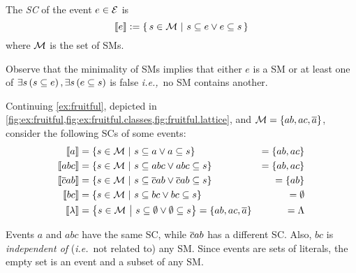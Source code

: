 \documentclass[x11names]{tlp}
\begin{document}
The \textit{\acf{SC}} of the event $e\in \EVENTSset$ is
\begin{equation}
	\stablecore{e} := \set{\, s \in \MODELset \given s \subseteq e \vee e \subseteq s\, } \label{eq:stable.core}
\end{equation}
where $\MODELset$ is the set of \aclp{SM}.

Observe that the minimality of \aclp{SM} implies that either $e$ is a \acl{SM} or at least one of $\exists s \del{s \subseteq e}, \exists s \del{e
		\subseteq s}$ is false \emph{i.e.,}\ no \acl{SM} contains another.

\ifExamples
	\begin{example}
		\label{ex:stable.cores}
		\em

		Continuing \cref{ex:fruitful}, depicted in
		\cref{fig:ex:fruitful,fig:ex:fruitful.classes,fig:fruitful.lattice}, and
		$\MODELset = \set{ab, ac, \co{a}}$, consider the following \aclp{SC} of some
		events:
		\begin{equation*}
			\begin{aligned}
				\stablecore{a}           & = \set{s \in \MODELset \given s \subseteq a \vee a \subseteq s}                                        & = \set{ab, ac}      %
				\\
				\stablecore{abc}         & = \set{s \in \MODELset \given s \subseteq abc \vee abc \subseteq s}                                    & = \set{ab, ac}      %
				\\
				\stablecore{\co{c}ab}    & = \set{s \in \MODELset \given s \subseteq \co{c}ab \vee \co{c}ab \subseteq s}                          & = \set{ab}          %
				\\
				\stablecore{bc}          & = \set{s \in \MODELset \given s \subseteq bc \vee bc \subseteq s}                                      & = \emptyset         %
				\\
				\stablecore{\emptyevent} & = \set{s \in \MODELset \given s \subseteq \emptyset \vee \emptyset \subseteq s} = \set{ab, ac, \co{a}} & = \consequenceclass %
				\\
			\end{aligned}
		\end{equation*}

		Events $a$ and $abc$ have the same \ac{SC}, while $\overline{c}ab$ has a different
		\ac{SC}.
Also, $bc$ is \emph{independent of} (\emph{i.e.}\ not related to)
		any \acl{SM}.
Since events are sets of literals, the empty set is an event
		and a subset of any \ac{SM}.
	\end{example}
\fi
\end{document}
